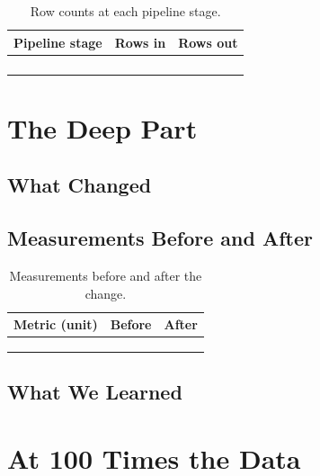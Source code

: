 \documentclass[11pt,letterpaper]{article}
\begin{document}
\begin{table}[htbp]
    \centering
    \caption{Row counts at each pipeline stage.}
    \begin{tabularx}{\linewidth}{@{}Xrr@{}}
        \toprule
        Pipeline stage & Rows in & Rows out \\
        \midrule
        & & \\
        & & \\
        & & \\
        & & \\
        \bottomrule
    \end{tabularx}
\end{table}

\section{The Deep Part}

\subsection{What Changed}

\subsection{Measurements Before and After}

\begin{table}[htbp]
    \centering
    \caption{Measurements before and after the change.}
    \begin{tabularx}{\linewidth}{@{}XXX@{}}
        \toprule
        Metric (unit) & Before & After \\
        \midrule
        & & \\
        & & \\
        & & \\
        \bottomrule
    \end{tabularx}
\end{table}

\subsection{What We Learned}

\section{At 100 Times the Data}
\end{document}
